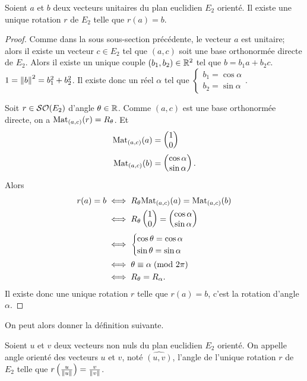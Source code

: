 \begin{prop}
  Soient \(a\) et \(b\) deux vecteurs unitaires du plan euclidien \(E_2\) 
  orienté. Il existe une unique rotation \(r\) de \(E_2\) telle que 
  \(r(a)=b\).
\end{prop}
\begin{proof}
  Comme dans la sous sous-section précédente, le vecteur \(a\) est unitaire; 
  alors il existe un vecteur \(c \in E_2\) tel que \((a,c)\) soit une base 
  orthonormée directe de \(E_2\). Alors il existe un unique couple \((b_1, 
  b_2) \in \mathbb{R}^2\) tel que \(b=b_1 a+b_2 c\). \(1=\left\lVert b\right\rVert^2=b_1^2+b_2^2\). 
  Il existe donc un réel \(\alpha\) tel que \(\begin{cases} b_1=\cos \alpha 
  \\ b_2=\sin\alpha\end{cases}\).

  Soit \(r \in \mathcal{SO}\!\left(E_2\right)\) d'angle \(\theta \in \mathbb{R}\). Comme \((a,c)\) est 
  une base orthonormée directe, on a \(\mathrm{Mat}_{(a,c)}(r)=R_\theta\). Et
  \begin{align*}
    \mathrm{Mat}_{(a,c)}(a) &= \begin{pmatrix} 1 \\ 0 \end{pmatrix} \\
      \mathrm{Mat}_{(a,c)}(b) &= \begin{pmatrix} \cos\alpha\\ \sin\alpha 
      \end{pmatrix}.
  \end{align*}
  Alors
  \begin{align*}
    r(a) = b &\iff R_\theta \mathrm{Mat}_{(a,c)}(a) = \mathrm{Mat}_{(a,c)}(b) \\
    &\iff R_\theta \begin{pmatrix} 1 \\ 0 \end{pmatrix} = \begin{pmatrix} 
  \cos\alpha\\ \sin\alpha \end{pmatrix} \\
  & \iff \begin{cases} \cos\theta = \cos\alpha \\ \sin\theta = \sin\alpha 
  \end{cases} \\
  &\iff \theta \equiv \alpha\!\pmod {2\pi} \\
  &\iff R_\theta = R_\alpha.
\end{align*}
Il existe donc une unique rotation \(r\) telle que \(r(a)=b\), c'est la 
rotation d'angle \(\alpha\).
\end{proof}
On peut alors donner la définition suivante.
\begin{defdef}
  Soient \(u\) et \(v\) deux vecteurs non nuls du plan euclidien \(E_2\) 
  orienté. On appelle angle orienté des vecteurs \(u\) et \(v\), noté 
  \(\widehat{(u,v)}\), l'angle de l'unique rotation \(r\) de \(E_2\) telle que 
  \(r\left(\frac{u}{\left\lVert u\right\rVert}\right)=\frac{v}{\left\lVert v\right\rVert}\).
\end{defdef}

